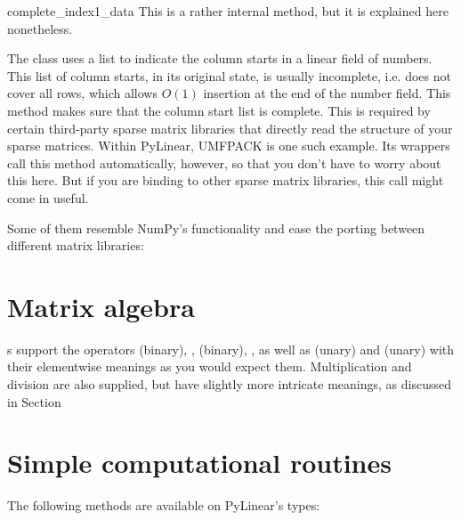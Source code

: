 \begin{methoddesc}[SparseExecuteMatrix]{complete_index1_data}{}
  This is a rather internal method, but it is explained here
  nonetheless.

  The  class uses a list to indicate the
  column starts in a linear field of numbers. This list of column
  starts, in its original state, is usually incomplete, i.e. does not
  cover all rows, which allows $O(1)$ insertion at the end of the
  number field. This method makes sure that the column start list is
  complete. This is required by certain third-party sparse matrix
  libraries that directly read the structure of your sparse
  matrices. Within PyLinear, UMFPACK is one such example. Its wrappers
  call this method automatically, however, so that you don't have to
  worry about this here. But if you are binding to other sparse matrix
  libraries, this call might come in useful.
\end{methoddesc}

Some of them resemble NumPy's functionality and ease the porting between
different matrix libraries:

\section{Matrix algebra}
s support the operators \code{+} (binary), \code{+=},
\code{-} (binary), \code{-=}, as well as \code{+} (unary) and \code{-}
(unary) with their elementwise meanings as you would expect them.
Multiplication and division are also supplied, but have slightly more
intricate meanings, as discussed in Section




\section{Simple computational routines}

The following methods are available on PyLinear's  types:

